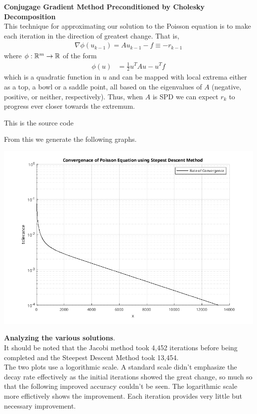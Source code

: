\documentclass[12pt,a4paper]{report}
\begin{document}
\noindent\textbf{Conjugage Gradient Method Preconditioned by Cholesky Decomposition}\\

This technique for approximating our solution to the Poisson equation is to make each iteration in the direction of greatest change.  That is, 
\begin{align*}
	\nabla \phi(u_{k-1}) = Au_{k-1}-f \equiv -r_{k-1}
\end{align*}where $\phi: \mathbb{R}^m \to \mathbb{R}$ of the form
\begin{align*}
	\phi(u) &= \frac{1}{2}u^TAu-u^Tf
\end{align*}which is a quadratic function in $u$ and can be mapped with local extrema either as a top, a bowl or a saddle point, all based on the eigenvalues of $A$ (negative, positive, or neither, respectively).  Thus, when $A$ is SPD we can expect $r_{k}$ to progress ever closer towards the extremum.

This is the source code
	

From this we generate the following graphs.

\includegraphics[scale=0.5]{ml04d.png} 

\noindent\textbf{Analyzing the various solutions}.\\

It should be noted that the Jacobi method took 4,452 iterations before being completed and the Steepest Descent Method took 13,454.\\  

The two plots use a logorithmic scale.  A standard scale didn't emphasize the decay rate effectively as the initial iterations showed the great change, so much so that the following improved accuracy couldn't be seen.  The logarithmic scale more effictively shows the improvement.  Each iteration provides very little but necessary improvement.
\end{document}
